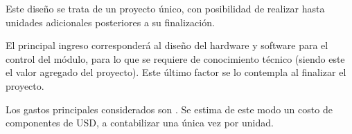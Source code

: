 

Este diseño se trata de un proyecto único, con posibilidad de realizar hasta \TBD unidades adicionales posteriores a su finalización.

El principal ingreso corresponderá al diseño del hardware y software para el control del módulo, para lo que se requiere de conocimiento técnico (siendo este el valor agregado del proyecto). Este último factor se lo contempla al finalizar el proyecto.


Los gastos principales considerados son \TBD. %
Se estima de este modo un costo de componentes de \TBD USD, a contabilizar una única vez por unidad.

